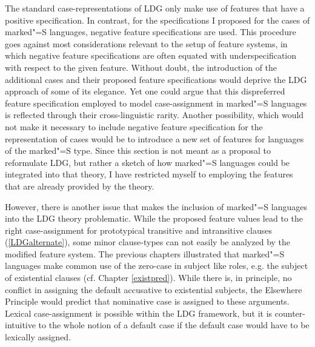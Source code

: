 The standard case-representations of LDG only make use of features that have a positive specification. 
In contrast, for the specifications I proposed for the cases of marked"=S languages, negative feature specifications are used. 
This procedure goes against most considerations relevant to the setup of feature systems, in which negative feature specifications are often equated with underspecification with respect to the given feature.
Without doubt, the introduction of the additional cases and their proposed feature specifications would deprive the LDG approach of some of its elegance.
Yet one could argue that this dispreferred feature specification employed to model case-assignment in marked"=S languages is reflected through their cross-linguistic rarity.   
Another possibility, which would not make it necessary to include negative feature specification for the representation of cases would be to introduce a new set of features for languages of the marked"=S type. 
Since this section is not meant as a proposal to reformulate LDG, but rather a sketch of how marked"=S languages could be integrated into that theory, I have restricted myself to employing the features that are already provided by the theory. 

However, there is another issue that makes the inclusion of marked"=S languages into the LDG theory problematic.
While the proposed feature values lead to the right case-assignment for prototypical transitive and intransitive clauses (\ref{LDGalternate}), some minor clause-types can not easily be analyzed by the modified feature system.
The previous chapters illustrated that marked"=S languages make common use of the zero-case in subject like roles, e.g. the subject of existential clauses (cf. Chapter \ref{existpred}). 
While there is, in principle, no conflict in assigning the default accusative to existential subjects, the Elsewhere Principle would predict that nominative case is assigned to these arguments. 
Lexical case-assignment is possible within the LDG framework, but it is counter-intuitive to the whole notion of a default case if the default case would have to be lexically assigned. 

